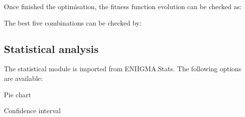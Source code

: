 \documentclass[letterpaper,10pt,english]{sphinxmanual}
\begin{document}
Once finished the optimisation, the fitness function evolution can be checked as:

\begin{sphinxVerbatim}[commandchars=\\\{\}]
   
 
\end{sphinxVerbatim}

The best five combinations can be checked by:

\begin{sphinxVerbatim}[commandchars=\\\{\}]
   
\end{sphinxVerbatim}


\subsection{Statistical analysis}
\label{\detokenize{Import_modules:statistical-analysis}}
The statistical module is imported from ENIIGMA.Stats. The following options are available:

Pie chart

\begin{sphinxVerbatim}[commandchars=\\\{\}]
   
\end{sphinxVerbatim}

Confidence interval

\begin{sphinxVerbatim}[commandchars=\\\{\}]
   
\end{sphinxVerbatim}
\end{document}
